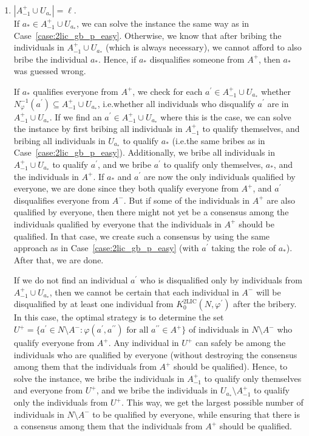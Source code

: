\documentclass[
    12pt,               %
    a4paper,            %
    bibtotoc,           %
    pointlessnumbers,   %
    ngerman,            %
    titlepage,          %
    leqno,              %
    ]{scrarticle}       %
\newcommand\caseref{Case~\ref}
\begin{document}
\begin{Proof}
\begin{enumerate}[
    leftmargin=*,
    label={\textit{Case \ref*{thm:2lic_gb_p}.\arabic*}:},
    ref={\ref*{thm:2lic_gb_p}.\arabic*}
]
\item
$|A^+_{-1} \cup U_{a_\ast}| = \ell$. \\
If $a_\ast \in A^+_{-1} \cup U_{a_\ast}$, we can solve the instance the same way as in \caseref{case:2lic_gb_p_easy}. Otherwise, we know that after bribing the individuals in $A^+_{-1} \cup U_{a_\ast}$ (which is always necessary), we cannot afford to also bribe the individual $a_\ast$. Hence, if $a_\ast$ disqualifies someone from $A^+$, then $a_\ast$ was guessed wrong.

If $a_\ast$ qualifies everyone from $A^+$, we check for each $a^\prime \in A^+_{-1} \cup U_{a_\ast}$ whether $N^{-1}_\varphi(a^\prime) \subseteq A^+_{-1} \cup U_{a_\ast}$, i.e.\@ whether all individuals who disqualify $a^\prime$ are in $A^+_{-1} \cup U_{a_\ast}$. If we find an $a^\prime \in A^+_{-1} \cup U_{a_\ast}$ where this is the case, we can solve the instance by first bribing all individuals in $A^+_{-1}$ to qualify themselves, and bribing all individuals in $U_{a_\ast}$ to qualify $a_\ast$ (i.e.\@ the same bribes as in \caseref{case:2lic_gb_p_easy}). Additionally, we bribe all individuals in $A^+_{-1} \cup U_{a_\ast}$ to qualify $a^\prime$, and we bribe $a^\prime$ to qualify only themselves, $a_\ast$, and the individuals in $A^+$. If $a_\ast$ and $a^\prime$ are now the only individuals qualified by everyone, we are done since they both qualify everyone from $A^+$, and $a^\prime$ disqualifies everyone from $A^-$. But if some of the individuals in $A^+$ are also qualified by everyone, then there might not yet be a consensus among the individuals qualified by everyone that the individuals in $A^+$ should be qualified. In that case, we create such a consensus by using the same approach as in \caseref{case:2lic_gb_p_easy} (with $a^\prime$ taking the role of $a_\ast$). After that, we are done.

If we do not find an individual $a^\prime$ who is disqualified only by individuals from $A^+_{-1} \cup U_{a_\ast}$, then we cannot be certain that each individual in $A^-$ will be disqualified by at least one individual from $K^{\text{2LIC}}_0(N, \varphi^\prime)$ after the bribery. In this case, the optimal strategy is to determine the set $U^+ = \{ a^\prime \in N \setminus A^- : \varphi(a^\prime, a^{\prime\prime}) \text{ for all } a^{\prime\prime} \in A^+ \}$ of individuals in $N \setminus A^-$ who qualify everyone from $A^+$. Any individual in $U^+$ can safely be among the individuals who are qualified by everyone (without destroying the consensus among them that the individuals from $A^+$ should be qualified). Hence, to solve the instance, we bribe the individuals in $A^+_{-1}$ to qualify only themselves and everyone from $U^+$, and we bribe the individuals in $U_{a_\ast} \setminus A^+_{-1}$ to qualify only the individuals from $U^+$. This way, we get the largest possible number of individuals in $N \setminus A^-$ to be qualified by everyone, while ensuring that there is a consensus among them that the individuals from $A^+$ should be qualified.
\end{enumerate}


\end{Proof}
\end{document}
